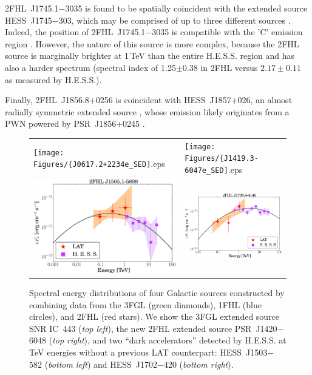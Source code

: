 2FHL~J1745.1$-$3035 is found to be spatially coincident with 
the extended source HESS~J1745$-$303, which may be comprised of
up to three different sources \citep{aharonian2008_j1745}. Indeed, the position of
2FHL~J1745.1$-$3035 is compatible  with the 'C' emission
region \citep[the second brightest region in the complex,][]{aharonian2008_j1745}.
However, the nature of this source is more complex, because
the 2FHL source is marginally brighter at 1\,TeV than the entire H.E.S.S. region and has also a harder spectrum (spectral index of 1.25$\pm0.38$ in 2FHL 
versus $2.17\pm 0.11$ as measured by H.E.S.S.).

Finally, 2FHL~J1856.8+0256 is coincident with HESS~J1857+026, an almost radially symmetric extended source  \citep{aharonian08_unid}, whose emission likely originates from a PWN powered by PSR~J1856+0245 \citep{rosseau2012}.

\begin{figure}[ht]
	\begin{center}
		\begin{tabular}{ll}
			\texttt{[image: Figures/\{J0617.2+2234e\_SED]}.eps} &
			\texttt{[image: Figures/\{J1419.3-6047e\_SED]}.eps}\\
			\includegraphics[width=8cm]{Figures/pgw_00682_SED.eps} &
			\includegraphics[width=8cm]{Figures/pgw_00110_SED.eps} \\
		\end{tabular}
	\end{center}
	\caption{
		\label{fig:gal_sed}Spectral energy distributions of four Galactic sources constructed by combining data from the 3FGL (green diamonds), 1FHL (blue circles), and 2FHL (red stars). We show the 3FGL extended source SNR IC~443 (\emph{top left}), the new 2FHL extended source PSR~J1420$-$6048 (\emph{top right}), and two ``dark accelerators'' detected by H.E.S.S. at TeV energies \citep[][purple squares]{carrigan2013} without a previous LAT counterpart:  { HESS~J1503$-$582} (\emph{bottom left}) and HESS~J1702$-$420 (\emph{bottom right}).}
\end{figure}

